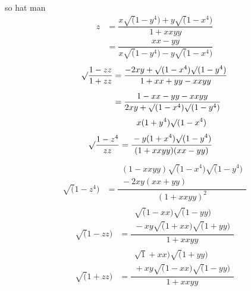 so hat man
\[
\begin{aligned}z&=\dfrac{x\surd(1-y^4)+y\surd(1-x^4)}{1+xxyy}\\[6pt]&=\dfrac{xx-yy}{x\surd(1-y^4)-y\surd(1-x^4)}\end{aligned}
\]
\[
\begin{aligned}\surd\dfrac{1-zz}{1+zz}&=\dfrac{-2xy+\surd(1-x^4)\surd(1-y^4)}{1+xx+yy-xxyy}\\[6pt]&=\dfrac{1-xx-yy-xxyy}{2xy+\surd(1-x^4)\surd(1-y^4)}\end{aligned}
\]
\[
\begin{aligned}\surd\dfrac{1-z^4}{zz}&=\dfrac{\begin{gathered}x(1+y^4)\surd(1-x^4)\\[3pt]{}-y(1+x^4)\surd(1-y^4)\end{gathered}}{(1+xxyy)(xx-yy)}\end{aligned}
\]
\[
\begin{aligned}\surd(1-z^4)&=\dfrac{\begin{gathered}(1-xxyy)\surd(1-x^4)\surd(1-y^4)\\[3pt]{}-2xy(xx+yy)\end{gathered}}{(1+xxyy)^2}\end{aligned}
\]
\[
\begin{aligned}\surd(1-zz)&=\dfrac{\begin{gathered}\surd(1-xx)\surd(1-yy)\\[3pt]{}-xy\surd(1+xx)\surd(1+yy)\end{gathered}}{1+xxyy}\end{aligned}
\]
\[
\begin{aligned}\surd(1+zz)&=\dfrac{\begin{gathered}\surd1+xx)\surd(1+yy)\\[3pt]{}+xy\surd(1-xx)\surd(1-yy)\end{gathered}}{1+xxyy}\end{aligned}
\]


